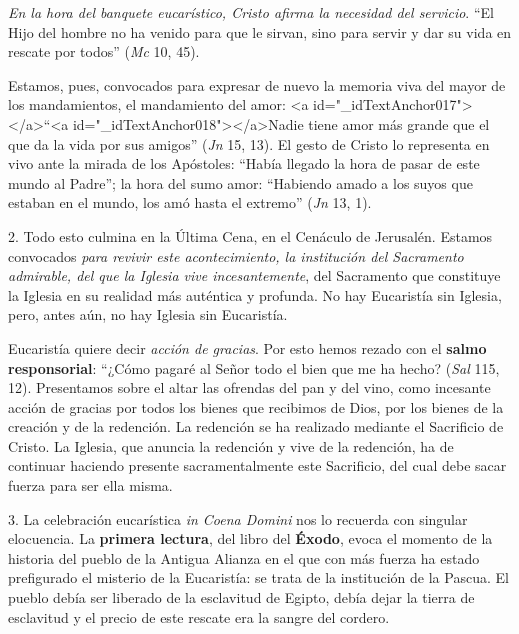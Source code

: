 			\begin{body}\textit{En la hora del banquete eucarístico, Cristo afirma la necesidad del servicio}. “El Hijo del hombre no ha venido para que le sirvan, sino para servir y dar su vida en rescate por todos” (\textit{Mc} 10, 45).\end{body}
			
			\begin{body}Estamos, pues, convocados para expresar de nuevo la memoria viva del mayor de los mandamientos, el mandamiento del amor: <a id="_idTextAnchor017"></a>“<a id="_idTextAnchor018"></a>Nadie tiene amor más grande que el que da la vida por sus amigos” (\textit{Jn} 15, 13). El gesto de Cristo lo representa en vivo ante la mirada de los Apóstoles: “Había llegado la hora de pasar de este mundo al Padre”; la hora del sumo amor: “Habiendo amado a los suyos que estaban en el mundo, los amó hasta el extremo” (\textit{Jn} 13, 1).\end{body}
			
			\begin{body}2. Todo esto culmina en la Última Cena, en el Cenáculo de Jerusalén. Estamos convocados \textit{para revivir este acontecimiento, la institución del Sacramento admirable, del que la Iglesia vive incesantemente}, del Sacramento que constituye la Iglesia en su realidad más auténtica y profunda. No hay Eucaristía sin Iglesia, pero, antes aún, no hay Iglesia sin Eucaristía.\end{body}
			
			\begin{body}Eucaristía quiere decir \textit{acción de gracias}. Por esto hemos rezado con el \textbf{salmo responsorial}: “¿Cómo pagaré al Señor todo el bien que me ha hecho? (\textit{Sal} 115, 12). Presentamos sobre el altar las ofrendas del pan y del vino, como incesante acción de gracias por todos los bienes que recibimos de Dios, por los bienes de la creación y de la redención. La redención se ha realizado mediante el Sacrificio de Cristo. La Iglesia, que anuncia la redención y vive de la redención, ha de continuar haciendo presente sacramentalmente este Sacrificio, del cual debe sacar fuerza para ser ella misma.\end{body}
			
			\begin{body}3. La celebración eucarística \textit{in Coena Domini} nos lo recuerda con singular elocuencia. La \textbf{primera lectura}, del libro del \textbf{Éxodo}, evoca el momento de la historia del pueblo de la Antigua Alianza en el que con más fuerza ha estado prefigurado el misterio de la Eucaristía: se trata de la institución de la Pascua. El pueblo debía ser liberado de la esclavitud de Egipto, debía dejar la tierra de esclavitud y el precio de este rescate era la sangre del cordero.\end{body}
			
